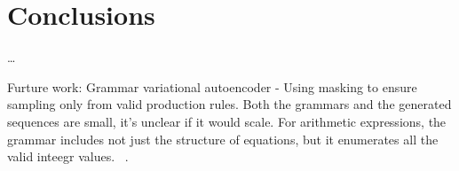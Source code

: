 \section{Conclusions}\label{sec:conclusion}

\ldots

Furture work: Grammar variational autoencoder - Using masking to ensure sampling only from valid production rules. Both the grammars and the generated sequences are small, it's unclear if it would scale. For arithmetic expressions, the grammar includes not just the structure of equations, but it enumerates all the valid inteegr values. ~\cite{Kusner2017}.